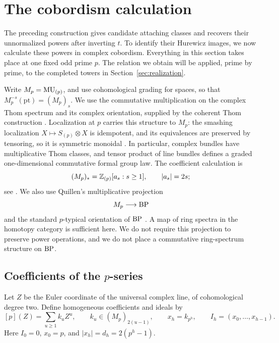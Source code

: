 \section{The cobordism calculation}
\label{sec:cobordism}

The preceding construction gives candidate attaching classes and recovers
their unnormalized powers after inverting $t$.  To identify their
Hurewicz images, we now calculate these powers in complex cobordism.
Everything in this section takes place at one fixed odd prime $p$.
The relation we obtain will be applied, prime by prime, to the completed
towers in Section~\ref{sec:realization}.

Write $M_p=\mathrm{MU}_{(p)}$, and use cohomological grading for spaces, so that
$M_p^{-s}(\mathrm{pt})=(M_p)_s$.  We use the commutative multiplication
on the complex Thom spectrum and its complex orientation, supplied by
the coherent Thom construction
\cite[Chapter~IV, Section~2, Construction~2.5 and Lemma~2.2]{May1977}.
Localization at $p$ carries this structure to $M_p$: the smashing
localization $X\mapsto S_{(p)}\otimes X$ is idempotent, and its
equivalences are preserved by tensoring, so it is symmetric monoidal
\cite[Proposition~2.2.1.9]{LurieHA}. In particular,
complex bundles have multiplicative Thom classes, and tensor product of
line bundles defines a graded one-dimensional commutative formal group
law.  The coefficient calculation is
\[
 (M_p)_*=\mathbb Z_{(p)}[a_s:s\geq 1],\qquad |a_s|=2s;
\]
see \cite[Chapter~2, Section~2.4, Theorem~4 of the English translation]{Novikov1962}.
We also use Quillen's multiplicative projection
\[
 M_p\longrightarrow\mathrm{BP}
\]
and the standard $p$-typical orientation of $\mathrm{BP}$
\cite[Section~5, Theorem~4]{Quillen1969}.  A map of ring spectra in the
homotopy category is sufficient here.  We do not require this projection
to preserve power operations, and we do not place a commutative
ring-spectrum structure on $\mathrm{BP}$.

\subsection{Coefficients of the \texorpdfstring{$p$}{p}-series}

Let $Z$ be the Euler coordinate of the universal complex line, of
cohomological degree two.  Define homogeneous coefficients and ideals by
\begin{equation}
 \label{cob:p-series}
 [p](Z)=\sum_{u\geq 1}k_uZ^u,
 \qquad k_u\in(M_p)_{2(u-1)},
 \qquad x_h=k_{p^h},
 \qquad I_h=(x_0,\ldots,x_{h-1}).
\end{equation}
Here $I_0=0$, $x_0=p$, and $|x_h|=d_h=2(p^h-1)$.

